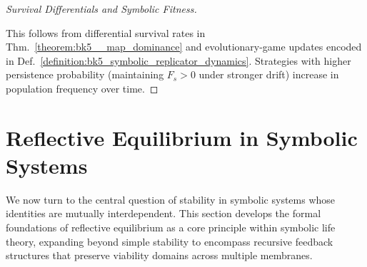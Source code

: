 \begin{proof}[Survival Differentials and Symbolic Fitness]
\label{proof:bk5_symbolic_fitness_differentials}
\leavevmode

This follows from differential survival rates in
Thm.~\ref{theorem:bk5__map_dominance} and evolutionary-game updates encoded in
Def.~\ref{definition:bk5_symbolic_replicator_dynamics}.
Strategies with higher persistence probability
(maintaining $F_s > 0$ under stronger drift) increase in population frequency
over time.
\end{proof}
\section{Reflective Equilibrium in Symbolic Systems}
\label{sec:bk5_reflective_equilibrium_in_symbolic_systems}
We now turn to the central question of stability in symbolic systems whose identities are mutually interdependent. This section develops the formal foundations of reflective equilibrium as a core principle within symbolic life theory, expanding beyond simple stability to encompass recursive feedback structures that preserve viability domains across multiple membranes.
